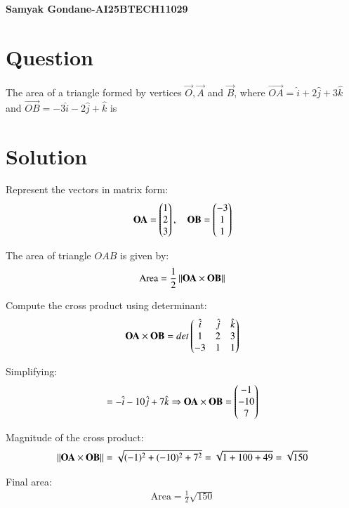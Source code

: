 \documentclass{article}
\begin{document}
\begin{center}
\large
    \textbf{Samyak Gondane-AI25BTECH11029}
\end{center}
\date{}

\section*{Question}
The area of a triangle formed by vertices $\vec{O}, \vec{A}$ and $\vec{B}$, where $\vec{OA} = \hat{i} + 2\hat{j} + 3\hat{k}$ and $\vec{OB} = -3\hat{i} - 2\hat{j} + \hat{k}$ is


\section*{Solution}

Represent the vectors in matrix form:
\begin{align}
\mathbf{OA} = \begin{pmatrix}1 \\ 2 \\ 3\end{pmatrix}, \quad
\mathbf{OB} = \begin{pmatrix}-3 \\ 1 \\ 1\end{pmatrix}
\end{align}

The area of triangle $OAB$ is given by:
\begin{align}
\text{Area} = \frac{1}{2} \left\lVert\mathbf{OA} \times \mathbf{OB}\right\rVert
\end{align}

Compute the cross product using determinant:
\begin{align}
\mathbf{OA} \times \mathbf{OB} =
det\begin{pmatrix}
\hat{i} & \hat{j} & \hat{k} \\
1 & 2 & 3 \\
-3 & 1 & 1
\end{pmatrix}
\end{align}

Simplifying:
\begin{align}
= -\hat{i} - 10\hat{j} + 7\hat{k}
\Rightarrow \mathbf{OA} \times \mathbf{OB} = \begin{pmatrix}-1 \\ -10 \\ 7\end{pmatrix}
\end{align}

Magnitude of the cross product:
\begin{align}
\left\lVert\mathbf{OA} \times \mathbf{OB}\right\rVert = \sqrt{(-1)^2 + (-10)^2 + 7^2} = \sqrt{1 + 100 + 49} = \sqrt{150}
\end{align}

Final area:
\begin{align}
\text{Area} = \frac{1}{2} \sqrt{150}
\end{align}
\end{document}
